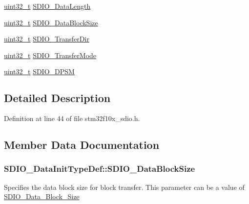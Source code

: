 \begin{DoxyCompactItemize}
\hyperlink{_p_e___types_8h_a33594304e786b158f3fb30289278f5af}{uint32\+\_\+t} \hyperlink{struct_s_d_i_o___data_init_type_def_ac325889a6dd582130a752aafc3ec9ee9}{S\+D\+I\+O\+\_\+\+Data\+Length}
\item 
\hyperlink{_p_e___types_8h_a33594304e786b158f3fb30289278f5af}{uint32\+\_\+t} \hyperlink{struct_s_d_i_o___data_init_type_def_a2252d17c4b3182830eb9f400489cb10f}{S\+D\+I\+O\+\_\+\+Data\+Block\+Size}
\item 
\hyperlink{_p_e___types_8h_a33594304e786b158f3fb30289278f5af}{uint32\+\_\+t} \hyperlink{struct_s_d_i_o___data_init_type_def_a4838fffdb3f87850569dff12f15485db}{S\+D\+I\+O\+\_\+\+Transfer\+Dir}
\item 
\hyperlink{_p_e___types_8h_a33594304e786b158f3fb30289278f5af}{uint32\+\_\+t} \hyperlink{struct_s_d_i_o___data_init_type_def_a58ac19aaaceb2791d4bbcd30f334dd21}{S\+D\+I\+O\+\_\+\+Transfer\+Mode}
\item 
\hyperlink{_p_e___types_8h_a33594304e786b158f3fb30289278f5af}{uint32\+\_\+t} \hyperlink{struct_s_d_i_o___data_init_type_def_ad5eb5f3c6fd9e5d4a6664c5cf57d6b03}{S\+D\+I\+O\+\_\+\+D\+P\+SM}
\end{DoxyCompactItemize}


\subsection{Detailed Description}


Definition at line 44 of file stm32f10x\+\_\+sdio.\+h.



\subsection{Member Data Documentation}
\subsubsection[{\texorpdfstring{S\+D\+I\+O\+\_\+\+Data\+Block\+Size}{SDIO_DataBlockSize}}]{ S\+D\+I\+O\+\_\+\+Data\+Init\+Type\+Def\+::\+S\+D\+I\+O\+\_\+\+Data\+Block\+Size}\hypertarget{struct_s_d_i_o___data_init_type_def_aa20c2fbb862f96597c876de6649d011d}{}\label{struct_s_d_i_o___data_init_type_def_aa20c2fbb862f96597c876de6649d011d}
Specifies the data block size for block transfer. This parameter can be a value of \hyperlink{group___s_d_i_o___data___block___size}{S\+D\+I\+O\+\_\+\+Data\+\_\+\+Block\+\_\+\+Size} 

